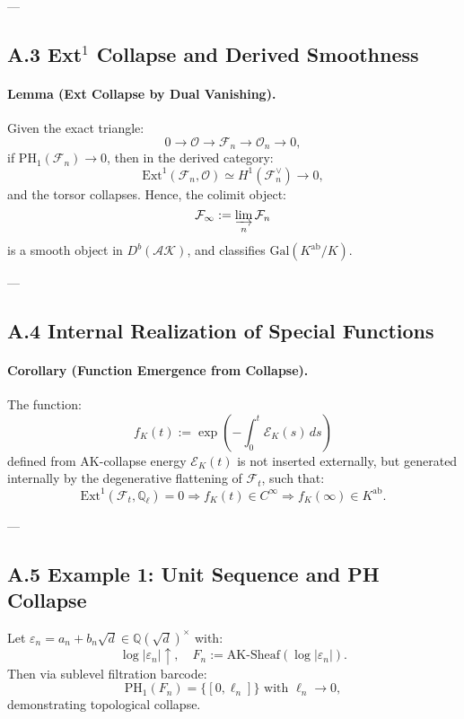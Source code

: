 \documentclass[11pt]{article}
\begin{document}
---

\subsection*{A.3 Ext$^1$ Collapse and Derived Smoothness}

\paragraph{Lemma (Ext Collapse by Dual Vanishing).}
Given the exact triangle:
\[
0 \to \mathcal{O} \to \mathcal{F}_n \to \mathcal{O}_n \to 0,
\]
if \( \mathrm{PH}_1(\mathcal{F}_n) \to 0 \), then in the derived category:
\[
\mathrm{Ext}^1(\mathcal{F}_n, \mathcal{O}) \simeq H^1(\mathcal{F}_n^\vee) \to 0,
\]
and the torsor collapses. Hence, the colimit object:
\[
\mathcal{F}_\infty := \varinjlim_n \mathcal{F}_n
\]
is a smooth object in \( D^b(\mathcal{AK}) \), and classifies \( \mathrm{Gal}(K^{\mathrm{ab}} / K) \).

---

\subsection*{A.4 Internal Realization of Special Functions}

\paragraph{Corollary (Function Emergence from Collapse).}
The function:
\[
f_K(t) := \exp\left(-\int_0^t \mathcal{E}_K(s)\, ds\right)
\]
defined from AK-collapse energy \(\mathcal{E}_K(t)\) is not inserted externally,  
but generated internally by the degenerative flattening of \( \mathcal{F}_t \), such that:
\[
\mathrm{Ext}^1(\mathcal{F}_t, \mathbb{Q}_\ell) = 0 \Rightarrow f_K(t) \in C^\infty \Rightarrow f_K(\infty) \in K^{\mathrm{ab}}.
\]

---

\subsection*{A.5 Example 1: Unit Sequence and PH Collapse}

Let \( \varepsilon_n = a_n + b_n \sqrt{d} \in \mathbb{Q}(\sqrt{d})^\times \) with:
\[
\log|\varepsilon_n| \uparrow,\quad F_n := \mathrm{AK\text{-}Sheaf}(\log|\varepsilon_n|).
\]
Then via sublevel filtration barcode:
\[
\mathrm{PH}_1(F_n) = \{[0, \ell_n]\} \text{ with } \ell_n \to 0,
\]
demonstrating topological collapse.
\end{document}
